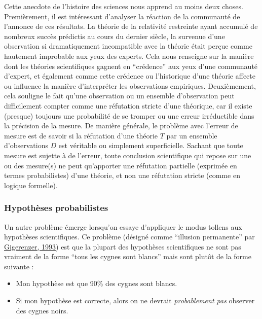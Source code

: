 \documentclass[
  a4paper,11pt,twoside,onecolumn,openright,final,oldfontcommands]{memoir}
\theoremstyle{definition}
\theoremstyle{definition}
\theoremstyle{definition}
\theoremstyle{definition}
\theoremstyle{remark}
\begin{document}
Cette anecdote de l'histoire des sciences nous apprend au moins deux choses. Premièrement, il est intéressant d'analyser la réaction de la communauté de l'annonce de ces résultats. La théorie de la relativité restreinte ayant accumulé de nombreux succès prédictis au cours du dernier siècle, la survenue d'une observation si dramatiquement incompatible avec la théorie était perçue comme hautement improbable aux yeux des experts. Cela nous renseigne sur la manière dont les théories scientifiques gagnent en ``crédence'' aux yeux d'une communauté d'expert, et également comme cette crédence ou l'historique d'une théorie affecte ou influence la manière d'interpréter les observations empiriques. Deuxièmement, cela souligne le fait qu'une observation ou un ensemble d'observation peut difficilement compter comme une réfutation stricte d'une théorique, car il existe (presque) toujours une probabilité de se tromper ou une erreur irréductible dans la précision de la mesure. De manière générale, le problème avec l'erreur de mesure est de savoir si la réfutation d'une théorie \(T\) par un ensemble d'observations \(D\) est véritable ou simplement superficielle. Sachant que toute mesure est sujette à de l'erreur, toute conclusion scientifique qui repose sur une ou des mesure(s) ne peut qu'apporter une réfutation partielle (exprimée en termes probabilistes) d'une théorie, et non une réfutation stricte (comme en logique formelle).

\hypertarget{hypothuxe8ses-probabilistes}{%
\subsubsection{Hypothèses probabilistes}\label{hypothuxe8ses-probabilistes}}

Un autre problème émerge lorsqu'on essaye d'appliquer le modus tollens aux hypothèses scientifiques. Ce problème (désigné comme ``illusion permanente'' par \protect\hyperlink{ref-gigerenzer_superego_1993}{Gigerenzer, 1993}) est que la plupart des hypothèses scientifiques ne sont pas vraiment de la forme ``tous les cygnes sont blancs'' mais sont plutôt de la forme suivante :

\begin{itemize}
\item
  Mon hypothèse est que 90\% des cygnes sont blancs.
\item
  Si mon hypothèse est correcte, alors on ne devrait \emph{probablement pas} observer des cygnes noirs.
\end{itemize}
\end{document}

